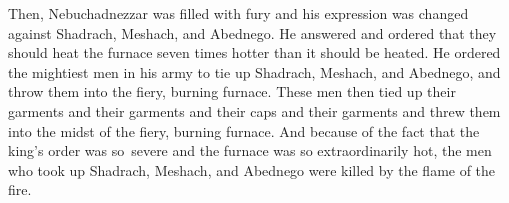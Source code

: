 \begin{inparaenum}
   Then, Nebuchadnezzar was filled with fury and his expression was changed against Shadrach, Meshach, and Abednego. He answered and ordered that they should heat the furnace seven times hotter than it should be heated.%
   He ordered the mightiest men in his army to tie up Shadrach, Meshach, and Abednego, and throw them into the fiery, burning furnace.%
   These men then tied up their garments and their garments and their caps and their garments and threw them into the midst of the fiery, burning furnace.%
   And because of the fact that the king's order was so\understood\ severe and the furnace was so extraordinarily hot, the men who took up Shadrach, Meshach, and Abednego were killed by the flame of the fire.%
  
  
  
\end{inparaenum}
